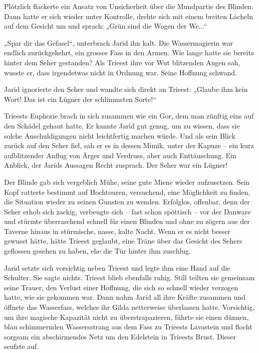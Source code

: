Plötzlich flackerte ein Ansatz von Unsicherheit über die Mundpartie des Blinden. Dann hatte er sich wieder unter Kontrolle, drehte sich mit einem breiten Lächeln auf dem Gesicht um und sprach: „Grün sind die Wogen der We...“

„Spar dir das Gefasel“, unterbrach Jarid ihn kalt. Die Wassermagierin war endlich zurückgekehrt, ein grosses Fass in den Armen. Wie lange hatte sie bereits hinter dem Seher gestanden? Als Trieest ihre vor Wut blitzenden Augen sah, wusste er, dass irgendetwas nicht in Ordnung war. Seine Hoffnung schwand.

Jarid ignorierte den Seher und wandte sich direkt an Trieest: „Glaube ihm kein Wort! Das ist ein Lügner der schlimmsten Sorte!“

Trieests Euphorie brach in sich zusammen wie ein Gor, dem man zünftig eins auf den Schädel gehaut hatte. Er kannte Jarid gut genug, um zu wissen, dass sie solche Anschuldigungen nicht leichtfertig machen würde. Und als sein Blick zurück auf den Seher fiel, sah er es in dessen Mimik, unter der Kapuze – ein kurz aufblitzender Anflug von Ärger und Verdruss, aber auch Enttäuschung. Ein Anblick, der Jarids Aussagen Recht zusprach. Der Seher war ein Lügner!

Der Blinde gab sich vergeblich Mühe, seine gute Miene wieder aufzusetzen. Sein Kopf ratterte bestimmt auf Hochtouren, versuchend, eine Möglichkeit zu finden, die Situation wieder zu seinen Gunsten zu wenden. Erfolglos, offenbar, denn der Seher erhob sich zackig, verbeugte sich – fast schon spöttisch – vor der Danware und stürmte überraschend schnell für einen Blinden und ohne zu zögern aus der Taverne hinaus in stürmische, nasse, kalte Nacht. Wenn er es nicht besser gewusst hätte, hätte Trieest geglaubt, eine Träne über das Gesicht des Sehers geflossen gesehen zu haben, ehe die Tür hinter ihm zuschlug.

Jarid setzte sich vorsichtig neben Trieest und legte ihm eine Hand auf die Schulter. Sie sagte nichts. Trieest blieb ebenfalls ruhig. Still teilten sie gemeinsam seine Trauer, den Verlust einer Hoffnung, die sich so schnell wieder verzogen hatte, wie sie gekommen war. Dann nahm Jarid all ihre Kräfte zusammen und öffnete das Wasserfass, welches ihr Gilda netterweise überlassen hatte. Vorsichtig, um ihre magische Kapazität nicht zu überstrapazieren, führte sie einen dünnen, blau schimmernden Wassersstrang aus dem Fass zu Trieests Lavastein und flocht sorgsam ein abschirmendes Netz um den Edelstein in Trieests Brust. Dieser seufzte auf.

